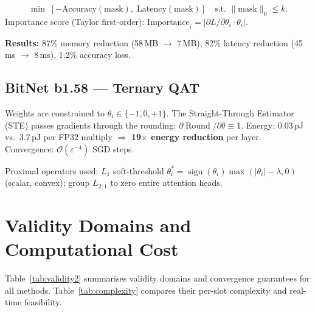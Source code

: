 \documentclass[conference]{IEEEtran}
\begin{document}
\begin{equation}
\min\;[-\text{Accuracy}(\text{mask}),\;\text{Latency}(\text{mask})]
\quad\text{s.t. }\|\text{mask}\|_0 \le k.
\end{equation}
Importance score (Taylor first-order):
$\mathrm{Importance}_i = |\partial L/\partial\theta_i \cdot \theta_i|$.

\textbf{Results:} 87\% memory reduction (58\,MB $\to$ 7\,MB), 82\% latency reduction (45\,ms $\to$ 8\,ms), 1.2\% accuracy loss.

\subsection{BitNet b1.58 --- Ternary QAT}

Weights are constrained to $\theta_i \in \{-1,0,+1\}$.
The Straight-Through Estimator (STE) passes gradients through the rounding:
$\partial\operatorname{Round}/\partial\theta \equiv 1$.
Energy: 0.03\,pJ vs.\ 3.7\,pJ per FP32 multiply $\Rightarrow$
\textbf{19$\times$ energy reduction} per layer.
Convergence: $\mathcal{O}(\varepsilon^{-4})$ SGD steps.

Proximal operators used: $L_1$ soft-threshold
$\theta_i^* = \operatorname{sign}(\theta_i)\max(|\theta_i|-\lambda,0)$
(scalar, convex); group $L_{2,1}$ to zero entire attention heads.

\section{Validity Domains and Computational Cost}
\label{sec:validity}

Table~\ref{tab:validity2} summarises validity domains and convergence guarantees for all methods. Table~\ref{tab:complexity} compares their per-slot complexity and real-time feasibility.
\end{document}
